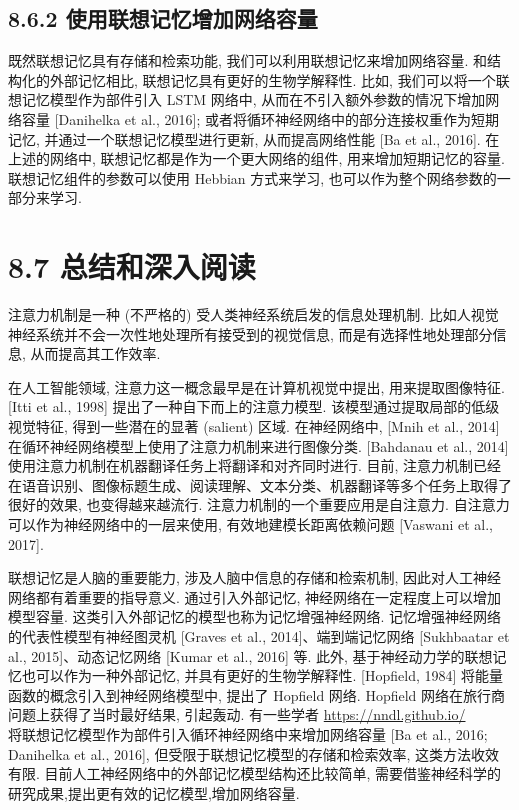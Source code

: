 \documentclass[10pt]{article}
\begin{document}
\subsection*{8.6.2 使用联想记忆增加网络容量}
既然联想记忆具有存储和检索功能, 我们可以利用联想记忆来增加网络容量. 和结构化的外部记忆相比, 联想记忆具有更好的生物学解释性. 比如, 我们可以将一个联想记忆模型作为部件引入 LSTM 网络中, 从而在不引入额外参数的情况下增加网络容量 [Danihelka et al., 2016]; 或者将循环神经网络中的部分连接权重作为短期记忆, 并通过一个联想记忆模型进行更新, 从而提高网络性能 [Ba et al., 2016]. 在上述的网络中, 联想记忆都是作为一个更大网络的组件, 用来增加短期记忆的容量. 联想记忆组件的参数可以使用 Hebbian 方式来学习, 也可以作为整个网络参数的一部分来学习.

\section*{8.7 总结和深入阅读}
注意力机制是一种 (不严格的) 受人类神经系统启发的信息处理机制. 比如人视觉神经系统并不会一次性地处理所有接受到的视觉信息, 而是有选择性地处理部分信息, 从而提高其工作效率.

在人工智能领域, 注意力这一概念最早是在计算机视觉中提出, 用来提取图像特征. [Itti et al., 1998] 提出了一种自下而上的注意力模型. 该模型通过提取局部的低级视觉特征, 得到一些潜在的显著 (salient) 区域. 在神经网络中, [Mnih et al., 2014] 在循环神经网络模型上使用了注意力机制来进行图像分类. [Bahdanau et al., 2014] 使用注意力机制在机器翻译任务上将翻译和对齐同时进行. 目前, 注意力机制已经在语音识别、图像标题生成、阅读理解、文本分类、机器翻译等多个任务上取得了很好的效果, 也变得越来越流行. 注意力机制的一个重要应用是自注意力. 自注意力可以作为神经网络中的一层来使用, 有效地建模长距离依赖问题 [Vaswani et al., 2017].

联想记忆是人脑的重要能力, 涉及人脑中信息的存储和检索机制, 因此对人工神经网络都有着重要的指导意义. 通过引入外部记忆, 神经网络在一定程度上可以增加模型容量. 这类引入外部记忆的模型也称为记忆增强神经网络. 记忆增强神经网络的代表性模型有神经图灵机 [Graves et al., 2014]、端到端记忆网络 [Sukhbaatar et al., 2015]、动态记忆网络 [Kumar et al., 2016] 等. 此外, 基于神经动力学的联想记忆也可以作为一种外部记忆, 并具有更好的生物学解释性. [Hopfield, 1984] 将能量函数的概念引入到神经网络模型中, 提出了 Hopfield 网络. Hopfield 网络在旅行商问题上获得了当时最好结果, 引起轰动. 有一些学者 \href{https://nndl.github.io/}{https://nndl.github.io/}\\
将联想记忆模型作为部件引入循环神经网络中来增加网络容量 [Ba et al., 2016; Danihelka et al., 2016], 但受限于联想记忆模型的存储和检索效率, 这类方法收效有限. 目前人工神经网络中的外部记忆模型结构还比较简单, 需要借鉴神经科学的研究成果,提出更有效的记忆模型,增加网络容量.
\end{document}
